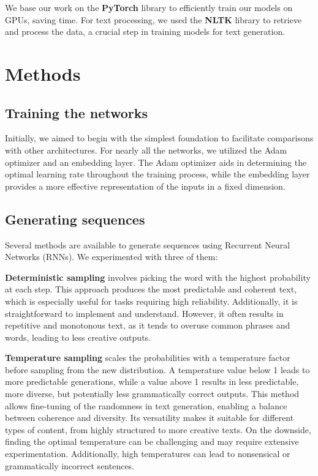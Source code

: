 \documentclass{article}
\begin{document}
We base our work on the \textbf{PyTorch} library to efficiently train our models on GPUs, saving time. For text processing, we used the \textbf{NLTK} library to retrieve and process the data, a crucial step in training models for text generation.

\section{Methods}

\subsection{Training the networks}

Initially, we aimed to begin with the simplest foundation to facilitate comparisons with other architectures. For nearly all the networks, we utilized the Adam optimizer and an embedding layer. The Adam optimizer aids in determining the optimal learning rate throughout the training process, while the embedding layer provides a more effective representation of the inputs in a fixed dimension.

\subsection{Generating sequences} 

Several methods are available to generate sequences using Recurrent Neural Networks (RNNs). We experimented with three of them:

\textbf{Deterministic sampling} involves picking the word with the highest probability at each step. This approach produces the most predictable and coherent text, which is especially useful for tasks requiring high reliability. Additionally, it is straightforward to implement and understand. However, it often results in repetitive and monotonous text, as it tends to overuse common phrases and words, leading to less creative outputs.

\textbf{Temperature sampling} scales the probabilities with a temperature factor before sampling from the new distribution. A temperature value below 1 leads to more predictable generations, while a value above 1 results in less predictable, more diverse, but potentially less grammatically correct outputs. This method allows fine-tuning of the randomness in text generation, enabling a balance between coherence and diversity. Its versatility makes it suitable for different types of content, from highly structured to more creative texts. On the downside, finding the optimal temperature can be challenging and may require extensive experimentation. Additionally, high temperatures can lead to nonsensical or grammatically incorrect sentences.
\end{document}
